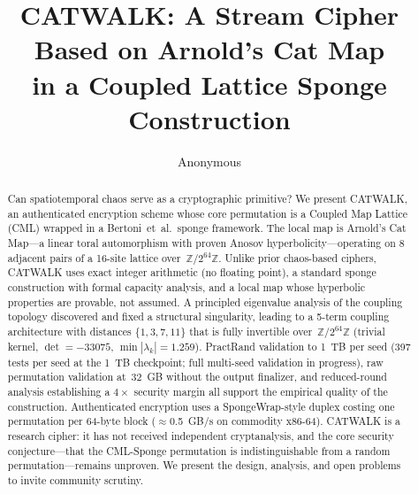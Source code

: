 \documentclass[runningheads]{llncs}
\newcommand{\Ztwo}{\mathbb{Z}/2^{64}\mathbb{Z}}
\begin{document}
\title{CATWALK: A Stream Cipher Based on Arnold's Cat Map\\in a Coupled Lattice Sponge Construction}

\author{Anonymous}

\maketitle

\begin{abstract}
Can spatiotemporal chaos serve as a cryptographic primitive?
We present CATWALK, an authenticated encryption scheme whose core permutation
is a Coupled Map Lattice (CML) wrapped in a Bertoni~et~al.\ sponge framework.
The local map is Arnold's Cat Map---a linear toral automorphism with proven
Anosov hyperbolicity---operating on 8 adjacent pairs of a 16-site lattice
over~$\Ztwo$.  Unlike prior chaos-based ciphers, CATWALK uses
exact integer arithmetic (no floating point), a standard sponge construction
with formal capacity analysis, and a local map whose hyperbolic properties are
provable, not assumed.  A principled eigenvalue analysis of the coupling
topology discovered and fixed a structural singularity, leading to a 5-term
coupling architecture with distances $\{1,3,7,11\}$ that is fully invertible
over~$\Ztwo$ (trivial kernel, $\det = -33075$, $\min|\lambda_k| = 1.259$).
PractRand validation to 1~TB per seed (397 tests per seed at the 1~TB checkpoint;
full multi-seed validation in progress), raw
permutation validation at~32~GB without the output finalizer, and
reduced-round analysis establishing a $4\times$ security margin all support
the empirical quality of the construction.  Authenticated encryption uses a
SpongeWrap-style duplex costing one permutation per 64-byte block
($\approx$0.5~GB/s on commodity x86-64).  CATWALK is a research cipher: it
has not received independent cryptanalysis, and the core security conjecture---that the CML-Sponge permutation is indistinguishable from a random
permutation---remains unproven.  We present the design, analysis, and open
problems to invite community scrutiny.
\end{abstract}

\end{document}
